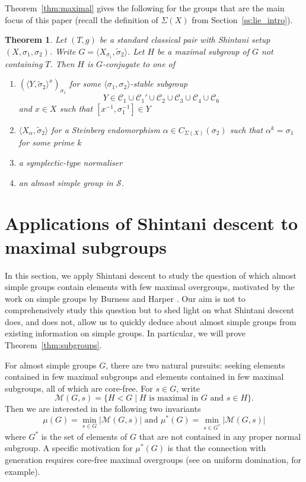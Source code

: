 \documentclass[11pt]{article}
\numberwithin{equation}{section}
\theoremstyle{shdefinition}
\theoremstyle{shplain}
\newtheorem{theorem}[definition]{Theorem}
\renewcommand{\a}{\alpha}
\newcommand{\s}{\sigma}
\newcommand{\ws}{\widetilde{\sigma}}
\newcommand{\C}{\mathcal{C}}
\newcommand{\M}{\mathcal{M}}
\renewcommand{\S}{\mathcal{S}}
\newcommand{\<}{\langle}
\renewcommand{\>}{\rangle}
\renewcommand{\:}{\colon}
\begin{document}
Theorem~\ref{thm:maximal} gives the following for the groups that are the main focus of this paper (recall the definition of $\Sigma(X)$ from Section~\ref{ss:lie_intro}).

\begin{theorem} \label{thm:maximal_classical}
Let $(T,g)$ be a standard classical pair with Shintani setup $(X,\s_1,\s_2)$. Write $G = \< X_{\s_1}, \ws_2 \>$. Let $H$ be a maximal subgroup of $G$ not containing $T$. Then $H$ is $G$-conjugate to one of
\begin{enumerate}[{\rm (I)}]
\item $(\<Y, \ws_2 \>^x)_{\s_1}$ for some $\<\s_1,\s_2\>$-stable subgroup 
\[
Y \in \C_1 \cup \C_1' \cup \C_2 \cup \C_3 \cup \C_4 \cup \C_6
\] 
and $x \in X$ such that $[x^{-1},\s_1^{-1}] \in Y$
\item $\< X_\a, \ws_2\>$ for a Steinberg endomorphism $\a \in C_{\Sigma(X)}(\s_2)$ such that $\a^k = \s_1$ for some prime $k$
\item a symplectic-type normaliser
\item an almost simple group in $\S$.
\end{enumerate}
\end{theorem}


\section{Applications of Shintani descent to maximal subgroups} \label{s:subgroups}

In this section, we apply Shintani descent to study the question of which almost simple groups contain elements with few maximal overgroups, motivated by the work on simple groups by Burness and Harper \cite{ref:BurnessHarper19}. Our aim is not to comprehensively study this question but to shed light on what Shintani descent does, and does not, allow us to quickly deduce about almost simple groups from existing information on simple groups. In particular, we will prove Theorem~\ref{thm:subgroups}.

For almost simple groups $G$, there are two natural pursuits: seeking elements contained in few maximal subgroups and elements contained in few maximal subgroups, all of which are core-free. For $s \in G$, write
\begin{equation*}
\M(G,s) = \{ H < G \mid \text{$H$ is maximal in $G$ and $s \in H$} \}.
\end{equation*} 
Then we are interested in the following two invariants
\begin{equation*}
\text{$\mu(G) = \min_{s \in G} |\M(G,s)|$ \ and \ $\mu^*(G) = \min_{s \in G^*} |\M(G,s)|$}
\end{equation*}
where $G^*$ is the set of elements of $G$ that are not contained in any proper normal subgroup. A specific motivation for $\mu^*(G)$ is that the connection with generation requires core-free maximal overgroups (see \cite[Corollary~2.2]{ref:BurnessHarper19} on uniform domination, for example).
\end{document}

